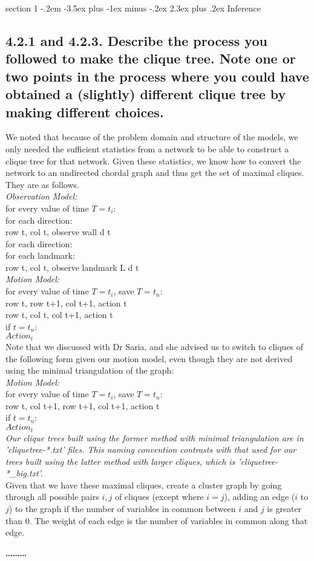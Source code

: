 \documentclass[12pt]{article}
\makeatletter
\newenvironment{problem}{\@startsection
       {section}
       {1}
       {-.2em}
       {-3.5ex plus -1ex minus -.2ex}
       {2.3ex plus .2ex}
       {\pagebreak[3]%
       \large\bf\noindent{Problem }
       }
       }
       {%
       \begin{center}\large\bf \ldots\ldots\ldots\end{center}}
\makeatother
\begin{document}
\begin{problem}{Inference}
\subsection*{4.2.1 and 4.2.3.
Describe the process you followed to make the clique tree. Note one or two
points in the process where you could have obtained a (slightly) different clique tree by
making different choices.}

We noted that because of the problem domain and structure of the models,
we only needed the sufficient statistics from a network to be able to 
construct a clique tree for that network.  Given these statistics, we 
know how to convert the network to an undirected chordal graph and thus
get the set of maximal cliques.  They are as follows. \\
\textit{Observation Model:}\\
for every value of time $T=t_i$:\\
\indent	for each direction:\\
\indent \indent row t, col t, observe wall d t\\
\indent	for each direction:\\
\indent	\indent	for each landmark:\\
\indent	\indent	\indent	row t, col t, observe landmark L d t\\
\textit{Motion Model:}\\
for every value of time $T=t_i$, save $T=t_n$:\\
\indent	row t, row t+1, col t+1, action t\\
\indent	row t, col t, col t+1, action t\\
if $t=t_n$: \\
\indent	$Action_t$ \\

\noindent Note that we discussed with Dr Saria, and she advised us to switch to cliques of the following form given our motion model, even though they are not derived using the minimal triangulation of the graph:\\
\textit{Motion Model:}\\
for every value of time $T=t_i$, save $T=t_n$:\\
\indent	row t, col t+1, row t+1, col t+1, action t\\
if $t=t_n$: \\
\indent	$Action_t$ \\
\textit{Our clique trees built using the former method with minimal triangulation are in 'cliquetree-*.txt' files.  This naming convention contrasts with that used for our trees built using the latter method with larger cliques, which is 'cliquetree-*\_big.txt'.}\\
Given that we have these maximal cliques, create a cluster graph by 
going through all possible pairs $i,j$ of cliques (except where $i=j$), 
adding an edge ($i$ to $j$) to the graph if the number of variables in 
common between $i$ and $j$ is greater than 0.  The weight of each edge is
the number of variables in common along that edge.\\


\end{problem}
\end{document}
